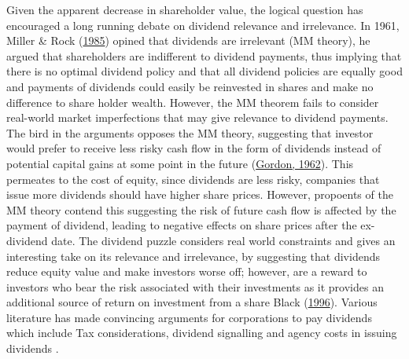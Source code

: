 \documentclass[12pt,preprint, authoryear]{elsarticle}
\numberwithin{equation}{section}
\numberwithin{figure}{section}
\numberwithin{table}{section}
\begin{document}
Given the apparent decrease in shareholder value, the logical question
has encouraged a long running debate on dividend relevance and
irrelevance. In 1961, Miller \& Rock
(\protect\hyperlink{ref-miller1985dividend}{1985}) opined that dividends
are irrelevant (MM theory), he argued that shareholders are indifferent
to dividend payments, thus implying that there is no optimal dividend
policy and that all dividend policies are equally good and payments of
dividends could easily be reinvested in shares and make no difference to
share holder wealth. However, the MM theorem fails to consider
real-world market imperfections that may give relevance to dividend
payments. The bird in the arguments opposes the MM theory, suggesting
that investor would prefer to receive less risky cash flow in the form
of dividends instead of potential capital gains at some point in the
future (\protect\hyperlink{ref-gordon1962}{Gordon, 1962}). This
permeates to the cost of equity, since dividends are less risky,
companies that issue more dividends should have higher share prices.
However, propoents of the MM theory contend this suggesting the risk of
future cash flow is affected by the payment of dividend, leading to
negative effects on share prices after the ex-dividend date. The
dividend puzzle considers real world constraints and gives an
interesting take on its relevance and irrelevance, by suggesting that
dividends reduce equity value and make investors worse off; however, are
a reward to investors who bear the risk associated with their
investments as it provides an additional source of return on investment
from a share Black (\protect\hyperlink{ref-black1996dividend}{1996}).
Various literature has made convincing arguments for corporations to pay
dividends which include Tax considerations, dividend signalling and
agency costs in issuing dividends .
\end{document}
